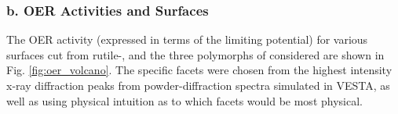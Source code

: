 
\subsubsection{b. OER Activities and Surfaces}

The OER activity (expressed in terms of the limiting potential) for various surfaces cut from rutile-, and the three polymorphs of  considered are shown in Fig. \ref{fig:oer_volcano}.
The specific facets were chosen from the highest intensity x-ray diffraction peaks from powder-diffraction spectra simulated in VESTA,
as well as using physical intuition as to which facets would be most physical.


